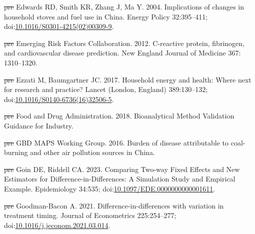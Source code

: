 \documentclass[
  letterpaper,
  DIV=11,
  numbers=noendperiod]{scrartcl}
\newlength{\cslhangindent}
\newenvironment{CSLReferences}[2] %
 {\begin{list}{}{%
  \setlength{\itemindent}{0pt} %
  \setlength{\leftmargin}{0pt} %
  \setlength{\parsep}{0pt} %
  \ifodd #1
   \setlength{\leftmargin}{\cslhangindent} %
   \setlength{\itemindent}{-1\cslhangindent} %
  \fi
  \setlength{\itemsep}{#2\baselineskip}}} %
 {\end{list}} %
\providecommand{\DIFdeltex}[1]{{\protect\color{red}\sout{#1}}}                      %
\providecommand{\DIFaddbegin}{} %
\providecommand{\DIFaddend}{} %
\providecommand{\DIFdelbegin}{} %
\providecommand{\DIFdelend}{} %
\providecommand{\DIFdel}[1]{\texorpdfstring{\DIFdeltex{#1}}{}} %
\newcommand{\DIFscaledelfig}{0.5}
\newlength{\DIFdelgraphicswidth} %
\newlength{\DIFdelgraphicsheight} %
\newcommand{\DIFaddincludegraphics}[2][]{{\color{blue}\fbox{\DIFOincludegraphics[#1]{#2}}}} %
\newcommand{\DIFdelincludegraphics}[2][]{%
\sbox{\DIFdelgraphicsbox}{\DIFOincludegraphics[#1]{#2}}%
\settoboxwidth{\DIFdelgraphicswidth}{\DIFdelgraphicsbox} %
\settoboxtotalheight{\DIFdelgraphicsheight}{\DIFdelgraphicsbox} %
\scalebox{\DIFscaledelfig}{%
\parbox[b]{\DIFdelgraphicswidth}{\usebox{\DIFdelgraphicsbox}\\[-\baselineskip] \rule{\DIFdelgraphicswidth}{0em}}\llap{\resizebox{\DIFdelgraphicswidth}{\DIFdelgraphicsheight}{%
\setlength{\unitlength}{\DIFdelgraphicswidth}%
\begin{picture}(1,1)%
\thicklines\linethickness{2pt} %
{\color[rgb]{1,0,0}\put(0,0){\framebox(1,1){}}}%
{\color[rgb]{1,0,0}\put(0,0){\line( 1,1){1}}}%
{\color[rgb]{1,0,0}\put(0,1){\line(1,-1){1}}}%
\end{picture}%
}\hspace*{3pt}}} %
} %
\DeclareRobustCommand{\DIFaddbegin}{\DIFOaddbegin \let\includegraphics\DIFaddincludegraphics} %
\DeclareRobustCommand{\DIFaddend}{\DIFOaddend \let\includegraphics\DIFOincludegraphics} %
\DeclareRobustCommand{\DIFdelbegin}{\DIFOdelbegin \let\includegraphics\DIFdelincludegraphics} %
\DeclareRobustCommand{\DIFdelend}{\DIFOaddend \let\includegraphics\DIFOincludegraphics} %
\begin{document}
\begin{CSLReferences}{1}{1}
\DIFdelbegin %
\DIFdel{pre}%
\DIFdelend \DIFaddbegin {}
\DIFaddend Edwards RD, Smith KR, Zhang J, Ma Y. 2004. Implications of changes in
household stoves and fuel use in {China}. Energy Policy 32:395--411;
doi:\href{https://doi.org/10.1016/S0301-4215(02)00309-9}{10.1016/S0301-4215(02)00309-9}.

\DIFdelbegin %
\DIFdel{pre}%
\DIFdelend \DIFaddbegin {}
\DIFaddend Emerging Risk Factors Collaboration. 2012. C-reactive protein,
fibrinogen, and cardiovascular disease prediction. New England Journal
of Medicine 367: 1310--1320.

\DIFdelbegin %
\DIFdel{pre}%
\DIFdelend \DIFaddbegin {}
\DIFaddend Ezzati M, Baumgartner JC. 2017. Household energy and health: Where next
for research and practice? Lancet (London, England) 389:130--132;
doi:\href{https://doi.org/10.1016/S0140-6736(16)32506-5}{10.1016/S0140-6736(16)32506-5}.

\DIFdelbegin %
\DIFdel{pre}%
\DIFdelend \DIFaddbegin {}
\DIFaddend Food and Drug Administration. 2018. Bioanalytical {Method Validation
Guidance} for {Industry}.

\DIFdelbegin %
\DIFdel{pre}%
\DIFdelend \DIFaddbegin {}
\DIFaddend GBD MAPS Working Group. 2016. Burden of disease attributable to
coal-burning and other air pollution sources in {China}.

\DIFdelbegin %
\DIFdel{pre}%
\DIFdelend \DIFaddbegin {}
\DIFaddend Goin DE, Riddell CA. 2023. Comparing {Two-way Fixed Effects} and {New
Estimators} for {Difference-in-Differences}: {A Simulation Study} and
{Empirical Example}. Epidemiology 34:535;
doi:\href{https://doi.org/10.1097/EDE.0000000000001611}{10.1097/EDE.0000000000001611}.

\DIFdelbegin %
\DIFdel{pre}%
\DIFdelend \DIFaddbegin {}
\DIFaddend Goodman-Bacon A. 2021. Difference-in-differences with variation in
treatment timing. Journal of Econometrics 225:254--277;
doi:\href{https://doi.org/10.1016/j.jeconom.2021.03.014}{10.1016/j.jeconom.2021.03.014}.


\end{CSLReferences}
\end{document}
